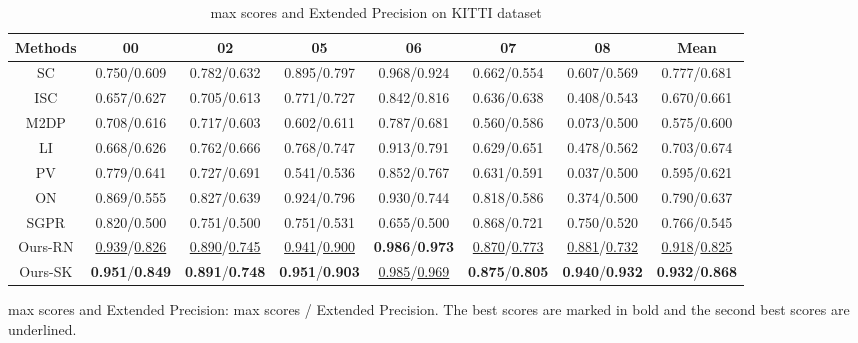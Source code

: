 \documentclass[letterpaper, 10 pt, conference]{ieeeconf}
\begin{document}
  \begin{table*}[htb]\footnotesize
    \caption{\centering  max scores and Extended Precision on KITTI dataset}\vspace{-3mm}
    \label{table:F1}
    \begin{center}
    \begin{threeparttable}
        {
    \begin{tabular}{c c c c c c c c}
    \hline
    Methods & 00 & 02 & 05 & 06 & 07 &08&Mean\\ 
    \hline
    SC\cite{SC} & 0.750/0.609 & 0.782/0.632 &0.895/0.797&0.968/0.924&0.662/0.554&0.607/0.569&0.777/0.681\\
    ISC\cite{ISC}&0.657/0.627&0.705/0.613&0.771/0.727&0.842/0.816&0.636/0.638&0.408/0.543&0.670/0.661\\
    M2DP\cite{M2DP}&0.708/0.616&0.717/0.603&0.602/0.611&0.787/0.681&0.560/0.586&0.073/0.500&0.575/0.600\\
    LI\cite{LI}&0.668/0.626&0.762/0.666&0.768/0.747&0.913/0.791&0.629/0.651&0.478/0.562&0.703/0.674\\
    PV\cite{PV}&0.779/0.641&0.727/0.691&0.541/0.536&0.852/0.767&0.631/0.591&0.037/0.500&0.595/0.621\\
    ON\cite{ON}&0.869/0.555&0.827/0.639&0.924/0.796&0.930/0.744&0.818/0.586&0.374/0.500&0.790/0.637\\
    SGPR\cite{SGPR}&0.820/0.500&0.751/0.500&0.751/0.531&0.655/0.500&0.868/0.721&0.750/0.520&0.766/0.545\\
    Ours-RN&\underline{0.939}/\underline{0.826}&\underline{0.890}/\underline{0.745}&\underline{0.941}/\underline{0.900}&\textbf{0.986}/\textbf{0.973}&\underline{0.870}/\underline{0.773}&\underline{0.881}/\underline{0.732}&\underline{0.918}/\underline{0.825}\\
    Ours-SK&\textbf{0.951}/\textbf{0.849}&\textbf{0.891}/\textbf{0.748}&\textbf{0.951}/\textbf{0.903}&\underline{0.985}/\underline{0.969}&\textbf{0.875}/\textbf{0.805}&\textbf{0.940}/\textbf{0.932}&\textbf{0.932}/\textbf{0.868}\\
    \hline
    \end{tabular}
    }
    \begin{tablenotes} 
\footnotesize
        \item  max scores and Extended Precision:  max scores / Extended Precision. The best scores are marked in bold and the second best scores are underlined.
\end{tablenotes}
    \end{threeparttable}
    \end{center}
    \end{table*}
\end{document}
